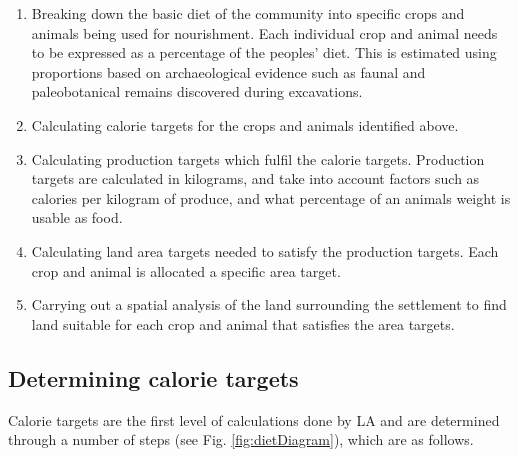   \begin{enumerate} 
  \item Breaking down the basic diet of the community into specific crops and
  animals being used for nourishment.  Each individual crop and animal needs to
  be expressed as a percentage of the peoples' diet.  This is estimated using
  proportions based on archaeological evidence such as faunal and
  paleobotanical remains discovered during excavations.  
  
  \item Calculating calorie targets for the crops and animals identified above.
 
  \item Calculating production targets which fulfil the calorie targets.
  Production targets are calculated in kilograms, and take into account factors
  such as calories per kilogram of produce, and what percentage of an animals
  weight is usable as food.  
  
  \item Calculating land area targets needed to satisfy the production targets.
  Each crop and animal is allocated a specific area target.  
  
  \item Carrying out a spatial analysis of the land surrounding the settlement
  to find land suitable for each crop and animal that satisfies the area
  targets.
  \end{enumerate}

\subsection{Determining calorie targets}
  Calorie targets are the first level of calculations done by LA and are
determined through a number of steps (see Fig.  \ref{fig:dietDiagram}), which
are as follows.




